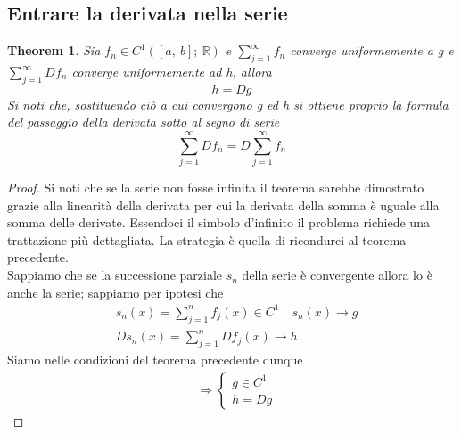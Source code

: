 \documentclass[10pt,a4paper]{article}
\newtheorem{theorem}{Theorem}
\newtheorem{proof}{Proof}
\begin{document}
\subsection{Entrare la derivata nella serie}
\begin{theorem}
	Sia \(f_n \in C^1([a,\ b];\ \mathbb{R})\) e $\sum_{j=1}^{\infty}f_n$ converge uniformemente a g e $\sum_{j=1}^{\infty}Df_n$ converge uniformemente ad h, allora 
	\[h = Dg\]
	Si noti che, sostituendo ciò a cui convergono g ed h si ottiene proprio la formula del passaggio della derivata sotto al segno di serie
	\[\sum_{j=1}^{\infty}Df_n = D\sum_{j=1}^{\infty}f_n\]
\end{theorem}
\begin{proof}
	Si noti che se la serie non fosse infinita il teorema sarebbe dimostrato grazie alla linearità della derivata per cui la derivata della somma è uguale alla somma delle derivate. Essendoci il simbolo d'infinito il problema richiede una trattazione più dettagliata. La strategia è quella di ricondurci al teorema precedente.\\
	Sappiamo che se la successione parziale \(s_n\) della serie è convergente allora lo è anche la serie; sappiamo per ipotesi che
	\begin{align*}
		&s_n(x) = \sum_{j=1}^{n}f_j(x) \in C^1 \quad s_n(x)\to g\\
		&Ds_n(x) = \sum_{j=1}^{n} Df_j(x)\to h
	\end{align*}
	Siamo nelle condizioni del teorema precedente dunque
	\begin{align*}
		&\Rightarrow 
		\begin{cases}
			g\in C^1\\
			h=Dg
		\end{cases}
	\end{align*}
\end{proof}
\end{document}
